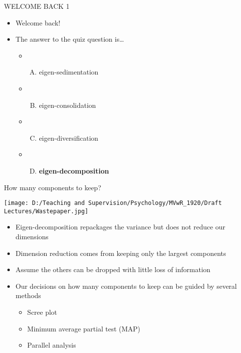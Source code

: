 \documentclass[
  ignorenonframetext,
]{beamer}
\providecommand{\tightlist}{%
  \setlength{\itemsep}{0pt}\setlength{\parskip}{0pt}}
\begin{document}
\begin{frame}{WELCOME BACK 1}
\protect\hypertarget{welcome-back-1}{}

\begin{itemize}
\item
  Welcome back!
\item
  The answer to the quiz question is\ldots{}

  \begin{itemize}
  \item
    \begin{enumerate}
    [A)]
    \tightlist
    \item
      eigen-sedimentation
    \end{enumerate}
  \item
    \begin{enumerate}
    [A)]
    \setcounter{enumi}{1}
    \tightlist
    \item
      eigen-consolidation
    \end{enumerate}
  \item
    \begin{enumerate}
    [A)]
    \setcounter{enumi}{2}
    \tightlist
    \item
      eigen-diversification
    \end{enumerate}
  \item
    \begin{enumerate}
    [A)]
    \setcounter{enumi}{3}
    \tightlist
    \item
      \textbf{eigen-decomposition}
    \end{enumerate}
  \end{itemize}
\end{itemize}

\end{frame}

\begin{frame}{How many components to keep?}
\protect\hypertarget{how-many-components-to-keep}{}

\texttt{[image: D:/Teaching and Supervision/Psychology/MVwR\_1920/Draft Lectures/Wastepaper.jpg]}

\begin{itemize}
\tightlist
\item
  Eigen-decomposition repackages the variance but does not reduce our
  dimensions
\item
  Dimension reduction comes from keeping only the largest components
\item
  Assume the others can be dropped with little loss of information
\item
  Our decisions on how many components to keep can be guided by several
  methods

  \begin{itemize}
  \tightlist
  \item
    Scree plot
  \item
    Minimum average partial test (MAP)
  \item
    Parallel analysis
  \end{itemize}
\end{itemize}

\end{frame}
\end{document}
